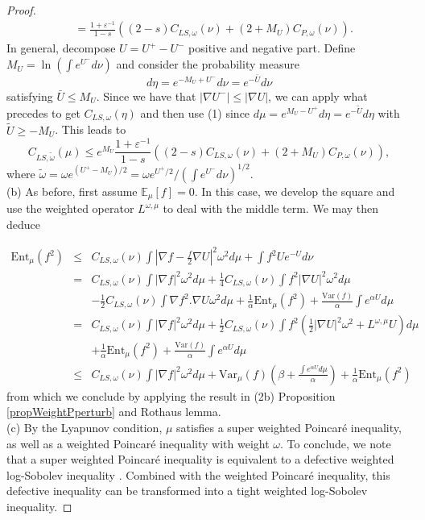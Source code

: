 \documentclass[11pt,reqno]{amsart}
\numberwithin{equation}{section}
\theoremstyle{definition}
\theoremstyle{remark}
\def \Var {\textrm{Var}}
\def \Ent {\textrm{Ent}}
\begin{document}
\begin{proof}
\begin{align*}
    & =\frac{1+\varepsilon^{-1}}{1-s} ((2-s)C_{LS, \omega}(\nu) + (2+M_U)C_{P, \omega}(\nu)).
\end{align*}
In general, decompose $U = U^+-U^-$ positive and negative part. Define  $M_U = \ln\left(\int e^{U^{-}}d\nu\right)$ and consider the probability measure
$$
d\eta =e^{-M_U+U^-}d\nu =e^{-\bar{U}}d\nu
$$
satisfying $\bar{U}\leq M_U$. Since we have that $|\nabla U^-|\leq |\nabla U|$, we can apply what precedes to get $C_{LS, \omega}(\eta)$ and then use (1) since $d\mu =e^{M_U-U^+}d\eta = e^{-\tilde U}d\eta$ with $\tilde U\geq -M_U$. This leads to
$$
    C_{LS, \tilde\omega}(\mu) \leq e^{M_U}\frac{1+\varepsilon^{-1}}{1-s}((2-s)C_{LS, \omega}(\nu) + (2 + M_U)C_{P, \omega}(\nu)), 
    $$
where $\tilde\omega = \omega e^{(U^+-M_U)/2} = \omega e^{U^+/2}/(\int e^{U^-}d\nu)^{1/2}$.\\

(b) As before, first assume $\mathbb{E}_\mu[f]=0$. In this case, we develop the square and use the weighted operator $L^{\omega, \mu}$ to deal with the middle term.
We may then deduce

\begin{eqnarray*}
    \Ent_\mu(f^2)  &\le&C_{LS,\omega}(\nu) \int|\nabla f- \frac{f}{2}\nabla U|^2\omega^2d\mu+ \int f^2 Ue^{-U}  d\nu\\
    &=& C_{LS,\omega}(\nu)\int|\nabla f|^2\omega^2d\mu+ \frac14C_{LS,\omega}(\nu)\int f^2|\nabla U|^2\omega^2d\mu\\
    &&-\frac12C_{LS,\omega}(\nu)\int \nabla f^2.\nabla U \omega^2d\mu + \frac{1}{\alpha}\Ent_\mu(f^2) + \frac{\Var(f)}{\alpha}\int e^{\alpha U} d\mu\\
    &=&C_{LS,\omega}(\nu)\int|\nabla f|^2\omega^2d\mu+ \frac12C_{LS,\omega}(\nu)\int f^2\left(\frac12|\nabla U|^2\omega^2 + L^{\omega,\mu}U\right)d\mu\\
    && + \frac{1}{\alpha}\Ent_\mu(f^2) + \frac{\Var(f)}{\alpha}\int e^{\alpha U} d\mu\\
    &\le& C_{LS,\omega}(\nu)\int|\nabla f|^2\omega^2d\mu+ \Var_\mu(f)\left(\beta + \frac{\int e^{\alpha U} d\mu}{\alpha}\right) + \frac{1}{\alpha}\Ent_\mu(f^2) 
\end{eqnarray*}
from which we conclude by applying the result in (2b) Proposition \ref{propWeightPperturb} and Rothaus lemma.
\\

(c) By the Lyapunov condition, $\mu$ satisfies a super weighted Poincar\'e inequality, as well as a weighted Poincar\'e inequality with weight $\omega$. 
To conclude, we note that a super weighted Poincar\'e inequality is equivalent to a defective weighted log-Sobolev inequality \cite{CGWu}. Combined with the weighted Poincar\'e inequality, this defective inequality can be transformed into a tight weighted log-Sobolev inequality.
\end{proof}
\end{document}
